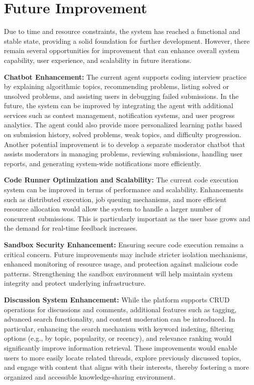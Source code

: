 \section{Future Improvement}

Due to time and resource constraints, the system has reached a functional and stable state, providing a solid foundation for further development. However, there remain several opportunities for improvement that can enhance overall system capability, user experience, and scalability in future iterations.

\textbf{Chatbot Enhancement:} The current agent supports coding interview practice by explaining algorithmic topics, recommending problems, listing solved or unsolved problems, and assisting users in debugging failed submissions. In the future, the system can be improved by integrating the agent with additional services such as contest management, notification systems, and user progress analytics. The agent could also provide more personalized learning paths based on submission history, solved problems, weak topics, and difficulty progression. Another potential improvement is to develop a separate moderator chatbot that assists moderators in managing problems, reviewing submissions, handling user reports, and generating system-wide notifications more efficiently.

\textbf{Code Runner Optimization and Scalability:} The current code execution system can be improved in terms of performance and scalability. Enhancements such as distributed execution, job queuing mechanisms, and more efficient resource allocation would allow the system to handle a larger number of concurrent submissions. This is particularly important as the user base grows and the demand for real-time feedback increases.

\textbf{Sandbox Security Enhancement:} Ensuring secure code execution remains a critical concern. Future improvements may include stricter isolation mechanisms, enhanced monitoring of resource usage, and protection against malicious code patterns. Strengthening the sandbox environment will help maintain system integrity and protect underlying infrastructure.

\textbf{Discussion System Enhancement:} While the platform supports CRUD operations for discussions and comments, additional features such as tagging, advanced search functionality, and content moderation can be introduced. In particular, enhancing the search mechanism with keyword indexing, filtering options (e.g., by topic, popularity, or recency), and relevance ranking would significantly improve information retrieval. These improvements would enable users to more easily locate related threads, explore previously discussed topics, and engage with content that aligns with their interests, thereby fostering a more organized and accessible knowledge-sharing environment.


